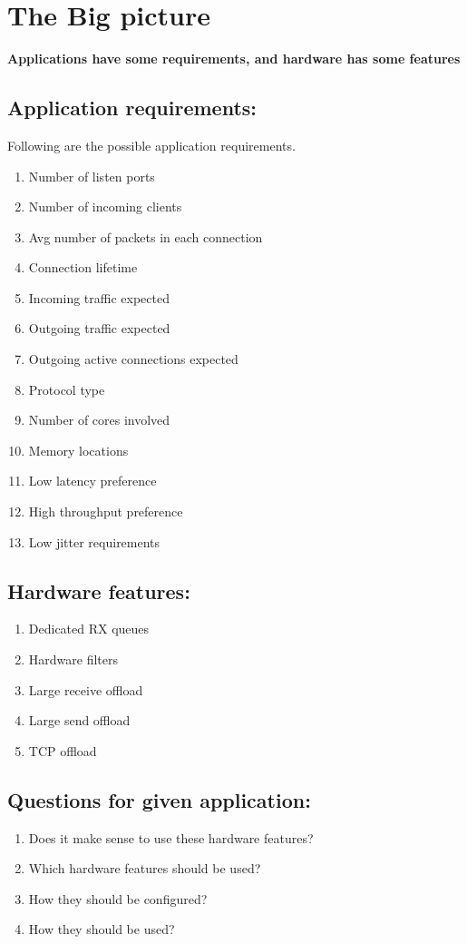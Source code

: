 \section{The Big picture}
\textbf{ Applications have some requirements, and hardware has some features}

\subsection{Application requirements:}
Following are the possible application requirements.

\begin{enumerate}
    \item Number of listen ports
    \item Number of incoming clients
    \item Avg number of packets in each connection
    \item Connection lifetime
    \item Incoming traffic expected
    \item Outgoing traffic expected
    \item Outgoing active connections expected
    \item Protocol type
    \item Number of cores involved
    \item Memory locations
    \item Low latency preference
    \item High throughput preference
    \item Low jitter requirements
\end{enumerate}

\subsection{Hardware features:}
\begin{enumerate}
     \item Dedicated RX queues
     \item Hardware filters
     \item Large receive offload
     \item Large send offload
     \item TCP offload
\end{enumerate}

\subsection{Questions for given application:}
\begin{enumerate}
     \item Does it make sense to use these hardware features?
     \item Which hardware features should be used?
     \item How they should be configured?
     \item How they should be used?
\end{enumerate}

